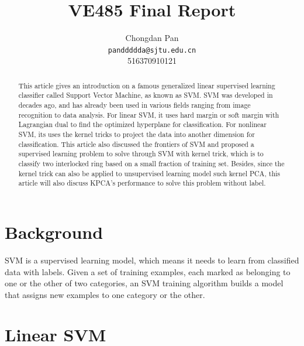 \documentclass{article}
\title{VE485 Final Report   }
\author{Chongdan Pan 
\\\texttt{panddddda@sjtu.edu.cn}
\\516370910121 
}
\begin{document}
\maketitle
\begin{abstract}
    This article gives an introduction on a famous generalized linear supervised learning classifier called Support Vector Machine, as known as SVM. SVM was developed in decades ago, and has already been used in various fields ranging from image recognition to data analysis. For linear SVM, it uses hard margin or soft margin with Lagrangian dual to find the optimized hyperplane for classification. For nonlinear SVM, its uses the kernel tricks to project the data into another dimension for classification. This article also discussed the frontiers of SVM and proposed a supervised learning problem to solve through SVM with kernel trick, which is to classify two interlocked ring based on a small fraction of training set. Besides, since the kernel trick can also be applied to unsupervised learning model such kernel PCA, this article will also discuss KPCA's performance to solve this problem without label.
\end{abstract}
\section{Background}
SVM is a supervised learning model, which means it needs to learn from classified data with labels. Given a set of training examples, each marked as belonging to one or the other of two categories, an SVM training algorithm builds a model that assigns new examples to one category or the other\cite{1}.
\section{Linear SVM} 
\end{document}

